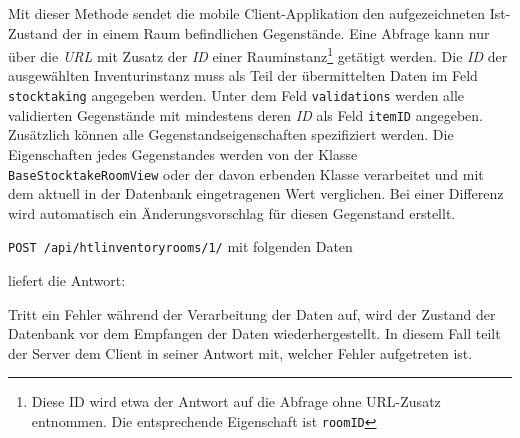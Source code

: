 Mit dieser Methode sendet die mobile Client-Applikation den
aufgezeichneten Ist-Zustand der in einem Raum befindlichen Gegenstände.
Eine Abfrage kann nur über die \emph{URL}
 mit Zusatz der \emph{ID}
einer Rauminstanz\footnote{Diese ID wird etwa der Antwort auf die
  Abfrage ohne URL-Zusatz entnommen. Die entsprechende Eigenschaft ist
  \texttt{roomID}} getätigt werden. Die \emph{ID}
der ausgewählten Inventurinstanz muss als Teil der übermittelten Daten
im Feld \texttt{stocktaking} angegeben werden. Unter dem Feld
\texttt{validations} werden alle validierten Gegenstände mit mindestens
deren \emph{ID}
als Feld \texttt{itemID} angegeben. Zusätzlich können alle
Gegenstandseigenschaften spezifiziert werden. Die Eigenschaften jedes
Gegenstandes werden von der Klasse \texttt{BaseStocktakeRoomView} oder
der davon erbenden Klasse verarbeitet und mit dem aktuell in der
Datenbank eingetragenen Wert verglichen. Bei einer Differenz wird
automatisch ein Änderungsvorschlag für diesen Gegenstand erstellt.

\texttt{POST\ /api/htlinventoryrooms/1/} mit folgenden Daten

\begin{Shaded}
\begin{Highlighting}[]
\FunctionTok{\{}
    \FunctionTok{:} \FunctionTok{,}
    \FunctionTok{:} \OtherTok{[}
        \FunctionTok{\{}
            \FunctionTok{:} 
        \FunctionTok{\}}\OtherTok{,}
        \FunctionTok{\{}
            \FunctionTok{:} 
        \FunctionTok{\}}
    \OtherTok{]}
\FunctionTok{\}}
\end{Highlighting}
\end{Shaded}

liefert die Antwort:

\begin{Shaded}
\begin{Highlighting}[]
\FunctionTok{\{}
    \FunctionTok{:} 
\FunctionTok{\}}
\end{Highlighting}
\end{Shaded}

Tritt ein Fehler während der Verarbeitung der Daten auf, wird der
Zustand der Datenbank vor dem Empfangen der Daten wiederhergestellt. In
diesem Fall teilt der Server dem Client in seiner Antwort mit, welcher
Fehler aufgetreten ist.

